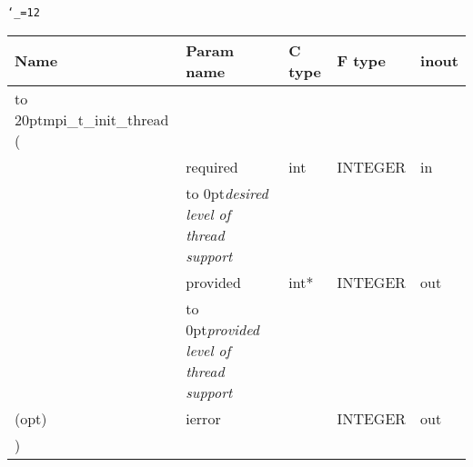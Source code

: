 \begingroup\tt\catcode`\_=12
\begin{tabular}{lllll}
\toprule
\textrm{Name}&\textrm{Param name}&\textrm{C type}&\textrm{F type}&\textrm{inout}\\
\midrule
\hbox to 20pt{mpi_t_init_thread (\hss} \\
&required&int&INTEGER&in\\ [-3pt]
&\hbox to 0pt{\footnotesize\sl desired level of thread support\hss}\\
&provided&int*&INTEGER&out\\ [-3pt]
&\hbox to 0pt{\footnotesize\sl provided level of thread support\hss}\\
(opt)&ierror&&INTEGER&out\\
)\\
\bottomrule
\end{tabular}
\endgroup

